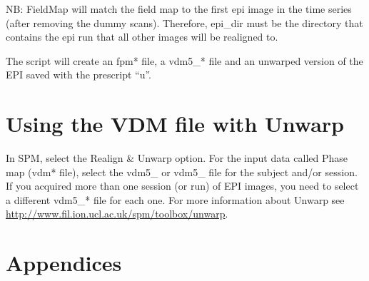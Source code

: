 NB: FieldMap will match the field map to the first epi image in the time series (after removing the dummy scans). Therefore, epi\_dir must be the directory that contains the epi run that all other images will be realigned to.

The script will create an fpm* file, a vdm5\_* file and an unwarped version of the EPI saved with the prescript ``u''.

\section{Using the VDM file with Unwarp \label{VDMuse}}
In SPM, select the Realign \& Unwarp option. For the input data called Phase map (vdm* file), select the vdm5\_\* or vdm5\_\* file for the subject and/or session. If you acquired more than one session (or run) of EPI images, you need to select a different vdm5\_* file for each one. For more information about Unwarp see \url{http://www.fil.ion.ucl.ac.uk/spm/toolbox/unwarp}.

\section{Appendices\label{FMAppendix}}

